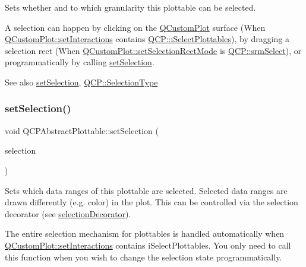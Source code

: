 Sets whether and to which granularity this plottable can be selected.

A selection can happen by clicking on the \mbox{\hyperlink{class_q_custom_plot}{Q\+Custom\+Plot}} surface (When \mbox{\hyperlink{class_q_custom_plot_a5ee1e2f6ae27419deca53e75907c27e5}{Q\+Custom\+Plot\+::set\+Interactions}} contains \mbox{\hyperlink{namespace_q_c_p_a2ad6bb6281c7c2d593d4277b44c2b037a67148c8227b4155eca49135fc274c7ec}{Q\+C\+P\+::i\+Select\+Plottables}}), by dragging a selection rect (When \mbox{\hyperlink{class_q_custom_plot_a810ef958ebe84db661c7288b526c0deb}{Q\+Custom\+Plot\+::set\+Selection\+Rect\+Mode}} is \mbox{\hyperlink{namespace_q_c_p_ac9aa4d6d81ac76b094f9af9ad2d3aacfa62c286e8da283a0cbb88ecac2f3f7506}{Q\+C\+P\+::srm\+Select}}), or programmatically by calling \mbox{\hyperlink{class_q_c_p_abstract_plottable_a219bc5403a9d85d3129165ec3f5ae436}{set\+Selection}}.

\begin{DoxySeeAlso}{See also}
\mbox{\hyperlink{class_q_c_p_abstract_plottable_a219bc5403a9d85d3129165ec3f5ae436}{set\+Selection}}, \mbox{\hyperlink{namespace_q_c_p_ac6cb9db26a564b27feda362a438db038}{Q\+C\+P\+::\+Selection\+Type}} 
\end{DoxySeeAlso}
\mbox{\label{class_q_c_p_abstract_plottable_a219bc5403a9d85d3129165ec3f5ae436}} 
\subsubsection{\texorpdfstring{set\+Selection()}{setSelection()}}
{\footnotesize\ttfamily void Q\+C\+P\+Abstract\+Plottable\+::set\+Selection (\begin{DoxyParamCaption}\item[{\mbox{\hyperlink{class_q_c_p_data_selection}{Q\+C\+P\+Data\+Selection}}}]{selection }\end{DoxyParamCaption})}

Sets which data ranges of this plottable are selected. Selected data ranges are drawn differently (e.\+g. color) in the plot. This can be controlled via the selection decorator (see \mbox{\hyperlink{class_q_c_p_abstract_plottable_a7861518e47ca0c6a0c386032c2db075e}{selection\+Decorator}}).

The entire selection mechanism for plottables is handled automatically when \mbox{\hyperlink{class_q_custom_plot_a5ee1e2f6ae27419deca53e75907c27e5}{Q\+Custom\+Plot\+::set\+Interactions}} contains i\+Select\+Plottables. You only need to call this function when you wish to change the selection state programmatically.

